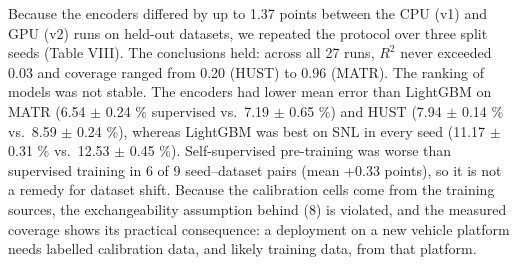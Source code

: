 \documentclass[journal]{IEEEtran}
\begin{document}
Because the encoders differed by up to 1.37 points between the CPU (v1) and GPU (v2) runs on held-out datasets, we repeated the protocol over three split seeds (Table VIII). The conclusions held: across all 27 runs, \(R^2\) never exceeded 0.03 and coverage ranged from 0.20 (HUST) to 0.96 (MATR). The ranking of models was not stable. The encoders had lower mean error than LightGBM on MATR (6.54 $\pm$ 0.24 \% supervised vs.~7.19 $\pm$ 0.65 \%) and HUST (7.94 $\pm$ 0.14 \% vs.~8.59 $\pm$ 0.24 \%), whereas LightGBM was best on SNL in every seed (11.17 $\pm$ 0.31 \% vs.~12.53 $\pm$ 0.45 \%). Self-supervised pre-training was worse than supervised training in 6 of 9 seed--dataset pairs (mean +0.33 points), so it is not a remedy for dataset shift. Because the calibration cells come from the training sources, the exchangeability assumption behind (8) is violated, and the measured coverage shows its practical consequence: a deployment on a new vehicle platform needs labelled calibration data, and likely training data, from that platform.
\end{document}
